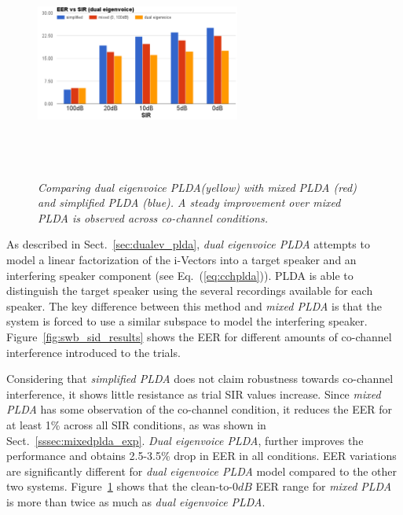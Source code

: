 \begin{figure}[b!]
	\centering
	\includegraphics[height = 3in, width=0.6\textwidth]{figures/eer_vs_sir_dualeigenvoice}
	\vspace{-2mm}
	\caption{\it \small Comparing {\it dual eigenvoice PLDA}(yellow) with {\it mixed PLDA} (red) and {\it simplified PLDA} (blue). A steady improvement over {\it mixed PLDA} is observed across co-channel conditions. }
	\label{fig:eer_dualeigenvoice}
	\vspace{-1mm}
\end{figure}

As described in Sect.~\ref{sec:dualev_plda}, {\it dual eigenvoice PLDA} attempts to model a linear factorization of the i-Vectors into a target speaker and an interfering speaker component (see Eq.~(\ref{eq:cchplda})). 
PLDA is able to distinguish the target speaker using the several recordings available for each speaker. 
The key difference between this method and {\it mixed PLDA} is that the system is forced to use a similar subspace to model the interfering speaker. 
Figure~\ref{fig:swb_sid_results} shows the EER for different amounts of co-channel interference introduced to the trials. 

Considering that {\it simplified PLDA} does not claim robustness towards co-channel interference, it shows little resistance as trial SIR values increase. 
Since {\it mixed PLDA} has some observation of the co-channel condition, it reduces the EER for at least 1\% across all SIR conditions, as was shown in Sect.~\ref{sssec:mixedplda_exp}. {\it Dual eigenvoice PLDA}, further improves the performance and obtains 2.5-3.5\% drop in EER in all conditions. EER variations are significantly different for {\it dual eigenvoice PLDA} model compared to the other two systems. 
Figure~\ref{fig:eer_dualeigenvoice} shows that the clean-to-$0dB$ EER range for {\it mixed PLDA} is more than twice as much as {\it dual eigenvoice PLDA}. 



